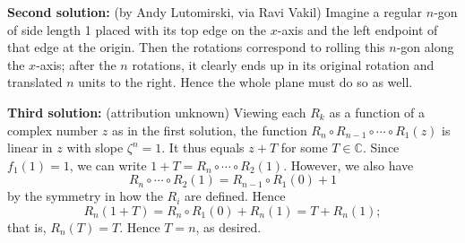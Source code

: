\documentclass[amssymb,twocolumn,pra,10pt,aps]{revtex4-1}
\newcommand{\CC}{\mathbb{C}}
\begin{document}
\begin{itemize}
\textbf{Second solution:}
(by Andy Lutomirski, via Ravi Vakil)
Imagine a regular $n$-gon of side length 1 placed with its top edge
on the $x$-axis and the left endpoint of that edge
at the origin. Then the rotations
correspond to rolling this $n$-gon along the $x$-axis; after the
$n$ rotations, it clearly ends up in its original rotation and translated
$n$ units to the right. Hence the whole plane must do so as well.

\textbf{Third solution:} (attribution unknown)
Viewing each $R_k$ as a function of a complex number $z$ as in the
first solution, the function $R_n \circ R_{n-1} \circ \cdots \circ
R_1(z)$ is linear in $z$ with slope $\zeta^n = 1$. It thus equals
$z + T$ for some $T \in \CC$. Since $f_1(1) = 1$, we can write
$1+T = R_n \circ \cdots \circ R_2(1)$. However, we also have
\[
R_n \circ \cdots \circ R_2(1) = R_{n-1} \circ R_1(0) + 1
\]
by the symmetry in how the $R_i$ are defined. Hence
\[
R_n(1+T) = R_n \circ R_1(0) + R_n(1) = T + R_n(1);
\]
that is, $R_n(T) = T$. Hence $T = n$, as desired.


\end{itemize}
\end{document}
